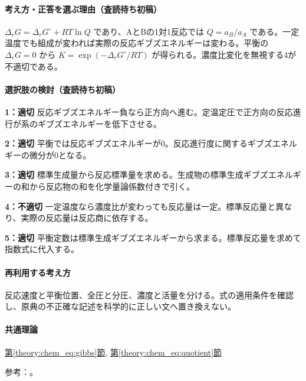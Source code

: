 \paragraph{考え方・正答を選ぶ理由（査読待ち初稿）} \(\Delta_rG=\Delta_rG^\circ+RT\ln Q\) であり、AとBの1対1反応では \(Q=a_B/a_A\) である。一定温度でも組成が変われば実際の反応ギブズエネルギーは変わる。平衡の \(\Delta_rG=0\) から \(K=\exp(-\Delta_rG^\circ/RT)\) が得られる。濃度比変化を無視する4が不適切である。

\paragraph{選択肢の検討（査読待ち初稿）}\mbox{}\par

\noindent\textbf{1：適切} 反応ギブズエネルギー負なら正方向へ進む。定温定圧で正方向の反応進行が系のギブズエネルギーを低下させる。\par

\noindent\textbf{2：適切} 平衡では反応ギブズエネルギーが0。反応進行度に関するギブズエネルギーの微分が0となる。\par

\noindent\textbf{3：適切} 標準生成量から反応標準量を求める。生成物の標準生成ギブズエネルギーの和から反応物の和を化学量論係数付きで引く。\par

\noindent\textbf{4：不適切} 一定温度なら濃度比が変わっても反応量は一定。標準反応量と異なり、実際の反応量は反応商に依存する。\par

\noindent\textbf{5：適切} 平衡定数は標準生成ギブズエネルギーから求まる。標準反応量を求めて指数式に代入する。\par

\paragraph{再利用する考え方} 反応速度と平衡位置、全圧と分圧、濃度と活量を分ける。式の適用条件を確認し、原典の不正確な記述を科学的に正しい文へ置き換えない。

\paragraph{共通理論} \hyperref[theory:chem_eq:gibbs]{第\ref*{theory:chem_eq:gibbs}節}, \hyperref[theory:chem_eq:quotient]{第\ref*{theory:chem_eq:quotient}節}

\par 参考：\cite{iupac_greenbook2012}。

